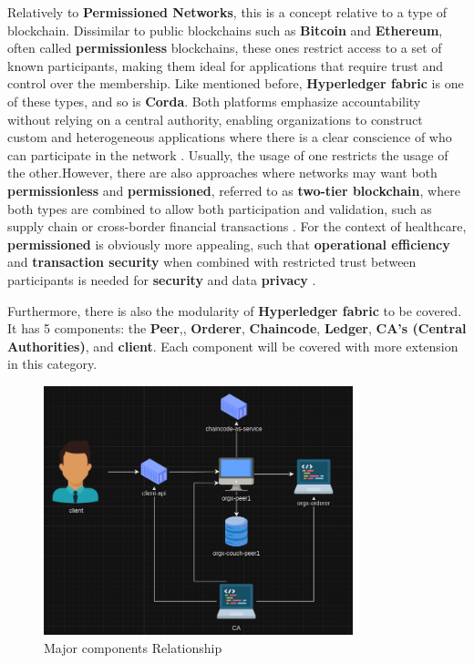 Relatively to \textbf{Permissioned Networks}, this is a concept relative to a type of blockchain. Dissimilar to public blockchains such as \textbf{Bitcoin} and \textbf{Ethereum}, often called \textbf{permissionless} blockchains, these ones restrict access to a set of known participants, making them ideal for applications that require trust and control over the membership. Like mentioned before, \textbf{Hyperledger fabric} is one of these types, and so is \textbf{Corda}. Both platforms emphasize accountability without relying on a central authority, enabling organizations to construct custom and heterogeneous applications where there is a clear conscience of who can participate in the network \cite{permissioned-blockchains}. Usually, the usage of one restricts the usage of the other.However, there are also approaches where networks may want both \textbf{permissionless} and \textbf{permissioned}, referred to as \textbf{two-tier blockchain}, where both types are combined to allow both participation and validation, such as supply chain or cross-border financial transactions \cite{two-tier-permission-blockchains}. For the context of healthcare, \textbf{permissioned} is obviously more appealing, such that \textbf{operational efficiency} and \textbf{transaction security} when combined with restricted trust between participants is needed for \textbf{security} and data \textbf{privacy} \cite{permissioned-vs-permissionless-tradeoffs}.

Furthermore, there is also the modularity of \textbf{Hyperledger fabric} to be covered. It has 5 components: the \textbf{Peer},, \textbf{Orderer}, \textbf{Chaincode}, \textbf{Ledger}, \textbf{CA's (Central Authorities)}, and \textbf{client}. Each component will be covered with more extension in this category.

\begin{figure}[H]
    \centering
    \includegraphics[width=0.8\textwidth]{assets/tools/hyperledger/hlf-minimal-setup.png} %
    \caption{Major components Relationship}
    \label{fig:sample-image} 
\end{figure}

